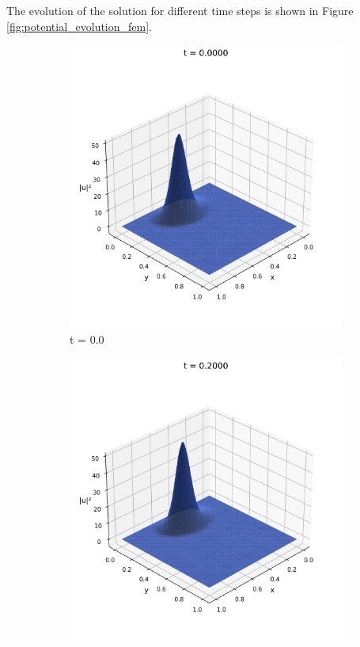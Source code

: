 \documentclass{article}
\theoremstyle{definition}
\theoremstyle{plain}
\theoremstyle{remark}
\begin{document}
The evolution of the solution for different time steps is shown in Figure \ref{fig:potential_evolution_fem}.

\begin{figure}[h]
  \centering
  \begin{subfigure}[b]{0.3\textwidth}
    \centering
    \includegraphics[width=\textwidth, trim=0cm 0cm 0cm 1cm, clip]{figures/fem_potential_frame_0000.png}
    \caption{t = 0.0}
  \end{subfigure}
  \hfill
  \begin{subfigure}[b]{0.3\textwidth}
    \centering
    \includegraphics[width=\textwidth, trim=0cm 0cm 0cm 1cm, clip]{figures/fem_potential_frame_0020.png}

\end{subfigure}
\end{figure}
\end{document}
